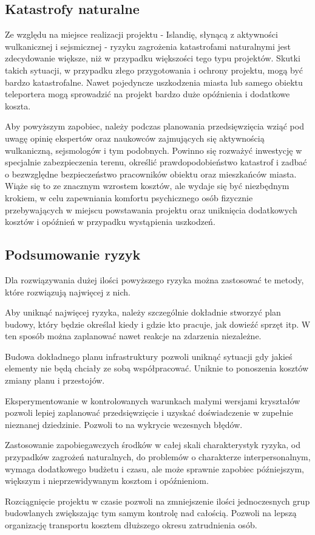 \subsection{Katastrofy naturalne}
Ze względu na miejsce realizacji projektu - Islandię, słynącą z aktywności wulkanicznej i sejsmicznej - ryzyku zagrożenia katastrofami naturalnymi jest zdecydowanie większe, niż w przypadku większości tego typu projektów. Skutki takich sytuacji, w przypadku złego przygotowania i ochrony projektu, mogą być bardzo katastrofalne. Nawet pojedyncze uszkodzenia miasta lub samego obiektu teleportera mogą sprowadzić na projekt bardzo duże opóźnienia i dodatkowe koszta.

Aby powyższym zapobiec, należy podczas planowania przedsięwzięcia wziąć pod uwagę opinię ekspertów oraz naukowców zajmujących się aktywnością wulkaniczną, sejsmologów i tym podobnych. Powinno się rozważyć inwestycję w specjalnie zabezpieczenia terenu, określić prawdopodobieństwo katastrof i zadbać o bezwzględne bezpieczeństwo pracowników obiektu oraz mieszkańców miasta. Wiąże się to ze znacznym wzrostem kosztów, ale wydaje się być niezbędnym krokiem, w celu zapewniania komfortu psychicznego osób fizycznie przebywających w miejscu powstawania projektu oraz uniknięcia dodatkowych kosztów i opóźnień w przypadku wystąpienia uszkodzeń.

\subsection{Podsumowanie ryzyk}
Dla rozwiązywania dużej ilości powyższego ryzyka można zastosować te metody, które rozwiązują najwięcej z nich.

Aby uniknąć najwięcej ryzyka, należy szczególnie dokładnie stworzyć plan budowy, który będzie określał kiedy i gdzie kto pracuje, jak dowieźć sprzęt itp.
W ten sposób można zaplanować nawet reakcje na zdarzenia niezależne.

Budowa dokładnego planu infrastruktury pozwoli uniknąć sytuacji gdy jakieś elementy nie będą chciały ze sobą współpracować.
Uniknie to ponoszenia kosztów zmiany planu i przestojów.

Eksperymentowanie w kontrolowanych warunkach małymi wersjami kryształów pozwoli lepiej zaplanować przedsięwzięcie i uzyskać doświadczenie w zupełnie nieznanej dziedzinie.
Pozwoli to na wykrycie wczesnych błędów.

Zastosowanie zapobiegawczych środków w całej skali charakterystyk ryzyka, od przypadków zagrożeń naturalnych, do problemów o charakterze interpersonalnym, wymaga dodatkowego budżetu i czasu, ale może sprawnie zapobiec późniejszym, większym i nieprzewidywanym kosztom i opóźnieniom.

Rozciągnięcie projektu w czasie pozwoli na zmniejszenie ilości jednoczesnych grup budowlanych zwiększając tym samym kontrolę nad całością.
Pozwoli na lepszą organizację transportu kosztem dłuższego okresu zatrudnienia osób.